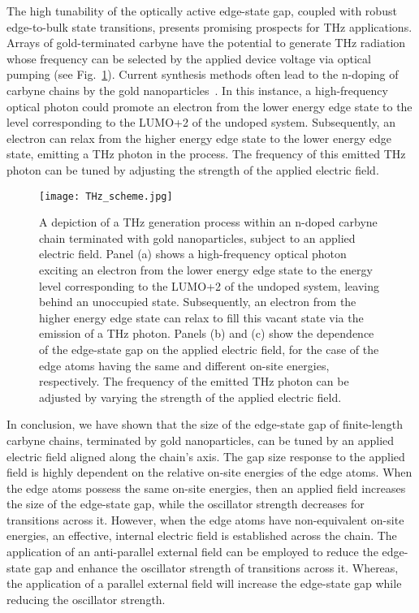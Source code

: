 \documentclass[
preprint,
 amsmath,amssymb,
 aps,
]{revtex4-2}
\begin{document}
The high tunability of the optically active edge-state gap, coupled with robust edge-to-bulk state transitions, presents promising prospects for THz applications. Arrays of gold-terminated carbyne have the potential to generate THz radiation whose frequency can be selected by the applied device voltage via optical pumping (see Fig.~\ref{fig:THz_scheme}). Current synthesis methods often lead to the n-doping of carbyne chains by the gold nanoparticles~\cite{portnoi2023polarization}. In this instance, a high-frequency optical photon could promote an electron from the lower energy edge state to the level corresponding to the LUMO+2  of the undoped system. Subsequently, an electron can relax from the higher energy edge state to the lower energy edge state, emitting a THz photon in the process. The frequency of this emitted THz photon can be tuned by adjusting the strength of the applied electric field.

\begin{figure}
\texttt{[image: THz\_scheme.jpg]}
\caption{
A depiction of a THz generation process within an n-doped carbyne chain terminated with gold nanoparticles, subject to an applied electric field. Panel (a) shows a high-frequency optical photon exciting an electron from the lower energy edge state to the energy level corresponding to the LUMO+2 of the undoped system, leaving behind an unoccupied state. Subsequently, an electron from the higher energy edge state can relax to fill this vacant state via the emission of a THz photon. Panels (b) and (c) show the dependence of the edge-state gap on the applied electric field, for the case of the edge atoms having the same and different on-site energies, respectively. The frequency of the emitted THz photon can be adjusted by varying the strength of the applied electric field.
}
\label{fig:THz_scheme}
\end{figure}



In conclusion, we have shown that the size of the edge-state gap of finite-length carbyne chains, terminated by gold nanoparticles, can be tuned by an applied electric field aligned along the chain’s axis. The gap size response to the applied field is highly dependent on the relative on-site energies of the edge atoms. When the edge atoms possess the same on-site energies, then an applied field increases the size of the edge-state gap, while the oscillator strength decreases for transitions across it. However, when the edge atoms have non-equivalent on-site energies, an effective, internal electric field is established across the chain. The application of an anti-parallel external field can be employed to reduce the edge-state gap and enhance the oscillator strength of transitions across it. Whereas, the application of a parallel external field will increase the edge-state gap while reducing the oscillator strength. 
\end{document}
